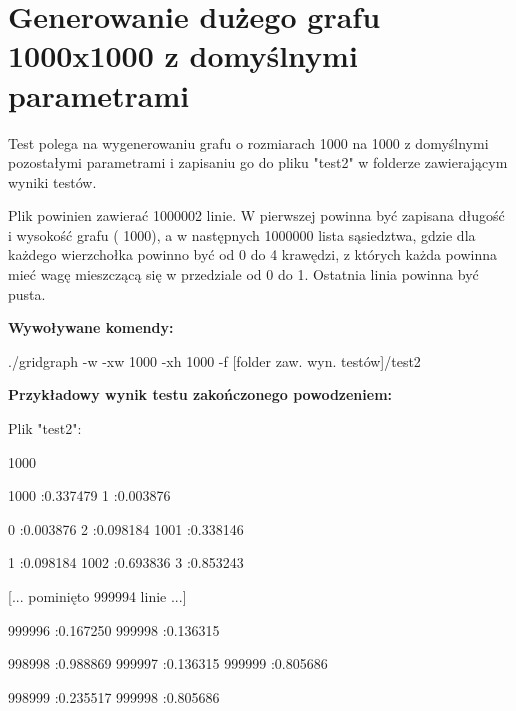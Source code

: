 \documentclass[11pt,a4paper]{report}
\def\console #1{\begingroup\fontfamily{qcr}\selectfont#1\endgroup}
\newenvironment{multiconsole}{\begingroup\fontfamily{qcr}\selectfont}{\endgroup}
\begin{document}
    \newpage
    \section{Generowanie dużego grafu 1000x1000 z domyślnymi parametrami}

    Test polega na wygenerowaniu grafu o rozmiarach 1000 na 1000 z domyślnymi pozostałymi parametrami i zapisaniu go do pliku "test2" w folderze zawierającym wyniki testów. 
    
    Plik powinien zawierać 1000002 linie. W pierwszej powinna być zapisana długość i wysokość grafu (\console{1000 1000}), a w następnych 1000000 lista sąsiedztwa, gdzie dla każdego wierzchołka powinno być od 0 do 4 krawędzi, z których każda powinna mieć wagę mieszczącą się w przedziale od 0 do 1. Ostatnia linia powinna być pusta.

    \vspace{2em}

    \textbf{Wywoływane komendy:}

    \vspace{1em}

    \begin{multiconsole}
        ./gridgraph -w -xw 1000 -xh 1000 -f [folder zaw. wyn. testów]/test2
    \end{multiconsole}

    \vspace{2em}

    \textbf{Przykładowy wynik testu zakończonego powodzeniem:}

    \vspace{1em}

    Plik "test2":

    \begin{multiconsole}
        1000 1000

        \hspace{2em}1000 :0.337479  1 :0.003876 

        \hspace{2em}0 :0.003876  2 :0.098184  1001 :0.338146 

        \hspace{2em}1 :0.098184  1002 :0.693836  3 :0.853243 

        [... pominięto 999994 linie ...]

        \hspace{2em}999996 :0.167250  999998 :0.136315 

        \hspace{2em}998998 :0.988869  999997 :0.136315  999999 :0.805686 

        \hspace{2em}998999 :0.235517  999998 :0.805686 
    \end{multiconsole}
    
\end{document}
